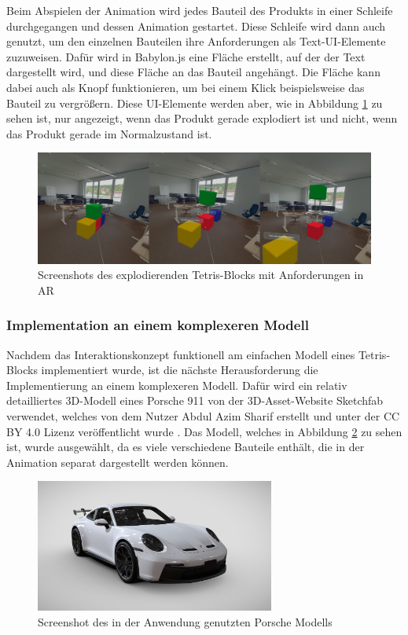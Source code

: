 Beim Abspielen der Animation wird jedes Bauteil des Produkts in einer Schleife durchgegangen und dessen Animation gestartet.
Diese Schleife wird dann auch genutzt, um den einzelnen Bauteilen ihre Anforderungen als Text-UI-Elemente zuzuweisen.
Dafür wird in Babylon.js eine Fläche erstellt, auf der der Text dargestellt wird, und diese Fläche an das Bauteil angehängt.
Die Fläche kann dabei auch als Knopf funktionieren, um bei einem Klick beispielsweise das Bauteil zu vergrößern.
Diese UI-Elemente werden aber, wie in Abbildung \ref{fig:tetris-explosion} zu sehen ist, nur angezeigt, wenn das Produkt gerade \glqq{}explodiert\grqq{} ist und nicht, wenn das Produkt gerade im Normalzustand ist.

\begin{figure}[H]
    \centering
    \includegraphics[width=1\textwidth]{images/tetris-explosion.png}
    \caption{Screenshots des explodierenden Tetris-Blocks mit Anforderungen in AR}
    \label{fig:tetris-explosion}
\end{figure}

\subsubsection{Implementation an einem komplexeren Modell}

Nachdem das Interaktionskonzept funktionell am einfachen Modell eines Tetris-Blocks implementiert wurde, ist die nächste Herausforderung die Implementierung an einem komplexeren Modell.
Dafür wird ein relativ detailliertes 3D-Modell eines Porsche 911 von der 3D-Asset-Website Sketchfab verwendet, welches von dem Nutzer Abdul Azim Sharif erstellt und unter der CC BY 4.0 Lizenz veröffentlicht wurde \autocite[][]{SketchfabPorsche}.
Das Modell, welches in Abbildung \ref{fig:porsche} zu sehen ist, wurde ausgewählt, da es viele verschiedene Bauteile enthält, die in der Animation separat dargestellt werden können.

\begin{figure}[H]
    \centering
    \includegraphics[width=0.7\textwidth]{images/PorscheModell.png}
    \caption{Screenshot des in der Anwendung genutzten Porsche Modells}
    \label{fig:porsche}
\end{figure}

